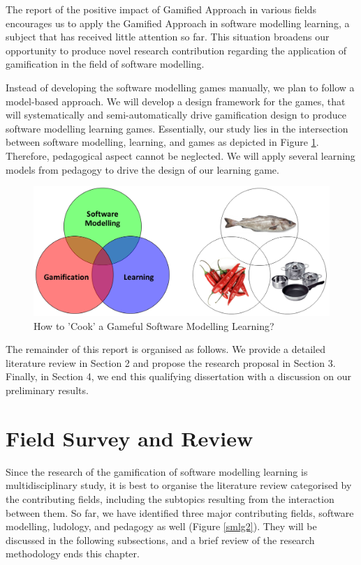 \documentclass[12pt, a4paper]{report}
\begin{document}
The report of the positive impact of Gamified Approach in various fields encourages us to apply the Gamified Approach in software modelling learning, a subject that has received little attention so far. This situation broadens our opportunity to produce novel research contribution regarding the application of gamification in the field of software modelling.  

Instead of developing the software modelling games manually, we plan to follow a model-based approach. We will develop a design framework for the games, that will systematically and semi-automatically drive gamification design to produce software modelling learning games. Essentially, our study lies in the intersection between software modelling, learning, and games as depicted in Figure \ref{smlg}. Therefore, pedagogical aspect cannot be neglected. We will apply several learning models from pedagogy to drive the design of our learning game. 

\begin{figure}[ht]
\centering
\includegraphics[width=\textwidth]{smlg}
\caption{How to 'Cook' a Gameful Software Modelling Learning?}
\label{smlg}
\end{figure}

The remainder of this report is organised as follows. We provide a detailed literature review in Section 2 and propose the research proposal in Section 3. Finally, in Section 4, we end this qualifying dissertation with a discussion on our preliminary results. 

\chapter{Field Survey and Review}
\label{Field Survey and Review}
Since the research of the gamification of software modelling learning is multidisciplinary study, it is best to organise the literature review categorised by the contributing fields, including the subtopics resulting from the interaction between them. So far, we have identified three major contributing fields, software modelling, ludology, and pedagogy as well (Figure \ref{smlg2}). They will be discussed in the following subsections, and a brief review of the research methodology ends this chapter.
\end{document}

